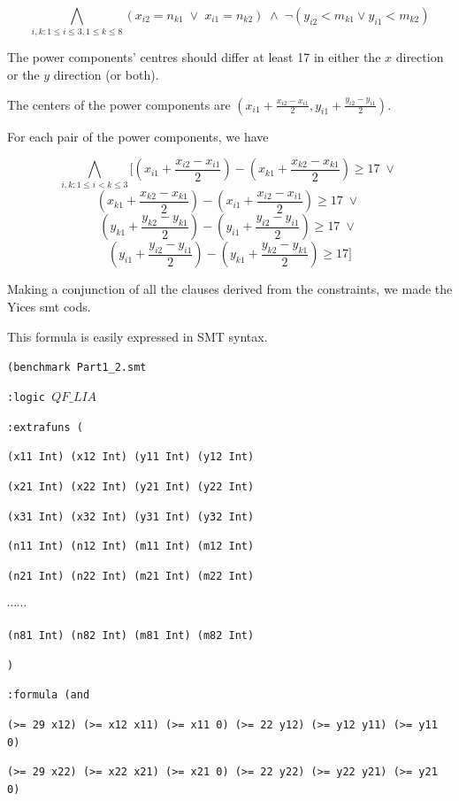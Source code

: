 \documentclass[11pt]{article}
\begin{document}
{\begin{description}
  \[  \bigwedge_{i,k: 1 \leq i \leq 3, 1 \leq k \leq 8}
  (x_{i2} = n_{k1} \; \vee \; x_{i1} = n_{k2}) \; \wedge \;
  \neg (y_{i2} < m_{k1} \vee y_{i1} < m_{k2}) \]
  \item[Constraint 5:] The power components' centres should differ at least 17 in either the $x$ direction or the $y$ direction (or both).

  The centers of the power components are $(x_{i1} + \frac{x_{i2} - x_{i1}}{2}, y_{i1} + \frac{y_{i2} - y_{i1}}{2} )$.

  For each pair of the power components, we have

  \[  \bigwedge_{i,k: 1 \leq i < k \leq 3}
  [ (x_{i1} + \frac{x_{i2} - x_{i1}}{2}) - (x_{k1} + \frac{x_{k2} - x_{k1}}{2}) \geq 17 \; \vee \; \]
  \[ (x_{k1} + \frac{x_{k2} - x_{k1}}{2}) - (x_{i1} + \frac{x_{i2} - x_{i1}}{2}) \geq 17 \; \vee \; \]
  \[ (y_{k1} + \frac{y_{k2} - y_{k1}}{2}) - (y_{i1} + \frac{y_{i2} - y_{i1}}{2}) \geq 17 \; \vee \; \]
  \[ (y_{i1} + \frac{y_{i2} - y_{i1}}{2}) - (y_{k1} + \frac{y_{k2} - y_{k1}}{2}) \geq 17 ] \]


\end{description}

Making a conjunction of all the clauses derived from the constraints, we made the Yices smt cods.

This formula is easily expressed in SMT syntax.

{\footnotesize

{\tt (benchmark Part1\_2.smt}

{\tt :logic $QF\_LIA$}

{\tt :extrafuns (}

{\tt (x11 Int) (x12 Int) (y11 Int) (y12 Int)}

{\tt (x21 Int) (x22 Int) (y21 Int) (y22 Int)}

{\tt (x31 Int) (x32 Int) (y31 Int) (y32 Int)}

{\tt (n11 Int) (n12 Int) (m11 Int) (m12 Int)}

{\tt (n21 Int) (n22 Int) (m21 Int) (m22 Int)}

$\cdots \cdots$

{\tt (n81 Int) (n82 Int) (m81 Int) (m82 Int)}

{\tt )}

{\tt :formula (and}

{\tt (>= 29 x12) (>= x12 x11) (>= x11 0) (>= 22 y12) (>= y12 y11) (>= y11 0)}

{\tt (>= 29 x22) (>= x22 x21) (>= x21 0) (>= 22 y22) (>= y22 y21) (>= y21 0)}

}}
\end{document}
